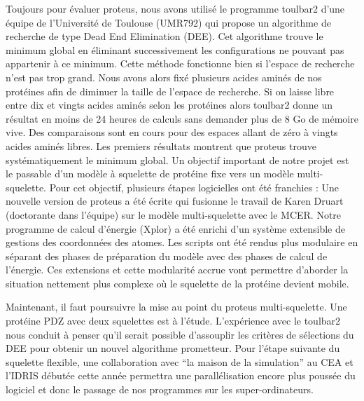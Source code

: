 \documentclass[a4paper,11pt]{article}
\begin{document}
\begin{spacing}{1.0}
  Toujours pour évaluer proteus, nous avons utilisé le programme toulbar2 d'une équipe de l'Université de Toulouse (UMR792) qui propose un algorithme de recherche de type Dead End Elimination (DEE). Cet algorithme trouve le minimum global en éliminant successivement les configurations ne pouvant pas appartenir à ce minimum. Cette méthode fonctionne bien si l'espace de recherche  n'est pas trop grand. Nous avons alors fixé plusieurs acides aminés de nos protéines afin de diminuer la taille de l'espace de recherche. Si on laisse libre entre dix et vingts acides aminés selon les protéines alors toulbar2 donne un résultat en moins de 24 heures de calculs sans demander plus de 8 Go de mémoire vive. Des comparaisons sont en cours pour des espaces allant de zéro à vingts acides aminés libres. Les premiers résultats montrent que proteus trouve systématiquement le minimum global. 
 \newpage
  Un objectif important de notre projet est le passable d'un modèle à squelette de protéine fixe vers un modèle multi-squelette. Pour cet objectif, plusieurs étapes logicielles ont été franchies :
Une nouvelle version de proteus a été écrite qui fusionne le travail de Karen Druart (doctorante dans l'équipe) sur le modèle multi-squelette  avec le MCER. Notre programme de calcul d'énergie (Xplor) a été enrichi d'un système extensible de gestions des coordonnées des atomes. Les scripts ont été rendus plus modulaire en séparant des phases de préparation du modèle avec des phases de calcul de l'énergie. Ces extensions et cette modularité accrue vont permettre d'aborder la situation nettement plus complexe où le squelette de la protéine devient mobile.    

  Maintenant, il faut poursuivre la mise au point du proteus multi-squelette. Une protéine PDZ avec deux squelettes est à l'étude. L'expérience avec le toulbar2 nous conduit à penser qu'il serait possible d'assouplir les critères de sélections du DEE pour obtenir un nouvel algorithme prometteur. Pour l'étape suivante du squelette flexible, une collaboration avec ``la maison de la simulation'' au CEA et l'IDRIS débutée cette année permettra une parallélisation encore plus poussée du logiciel et donc le passage de nos programmes sur les super-ordinateurs.


\end{spacing}
\end{document}
